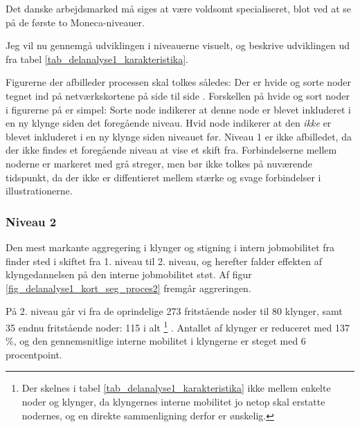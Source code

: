 Det danske arbejdsmarked må siges at være voldsomt specialiseret, blot ved at se på de første to Moneca-niveauer. 

Jeg vil nu gennemgå udviklingen i niveauerne visuelt, og beskrive udviklingen ud fra tabel \ref{tab_delanalyse1_karakteristika}.

Figurerne der afbilleder processen skal tolkes således: Der er hvide og sorte noder tegnet ind på netværkskortene på side \pageref{fig_delanalyse1_kort_seg_proces2} til side \pageref{fig_delanalyse1_kort_seg_proces5} . Forskellen på hvide og sort noder i figurerne på er simpel: Sorte node indikerer at denne node er blevet inkluderet i en ny klynge siden det foregående niveau. Hvid node indikerer at den \emph{ikke} er blevet inkluderet i en ny klynge siden niveauet før. 
Niveau 1 er ikke afbilledet, da der ikke findes et foregående niveau at vise et skift fra. 
Forbindelserne mellem noderne er markeret med grå streger, men bør ikke tolkes på nuværende tidspunkt, da der ikke er diffentieret mellem stærke og svage forbindelser i illustrationerne. 


\subsubsection{Niveau 2}



Den mest markante aggregering i klynger og stigning i intern jobmobilitet fra finder sted i skiftet fra 1. niveau til 2. niveau, og herefter falder effekten af klyngedannelsen på den interne jobmobilitet støt. Af figur \ref{fig_delanalyse1_kort_seg_proces2} fremgår aggreringen. 

På 2. niveau går vi fra de oprindelige 273 fritstående noder til 80 klynger, samt 35 endnu fritstående noder: 115 i alt%
%
\footnote{ Der skelnes i tabel \ref{tab_delanalyse1_karakteristika} ikke mellem enkelte noder og klynger, da klyngernes interne mobilitet jo netop skal erstatte nodernes, og en direkte sammenligning derfor er ønskelig.}%
%
. Antallet af klynger er reduceret med 137 \%, og den gennemsnitlige interne mobilitet i klyngerne er steget med 6 procentpoint. 


